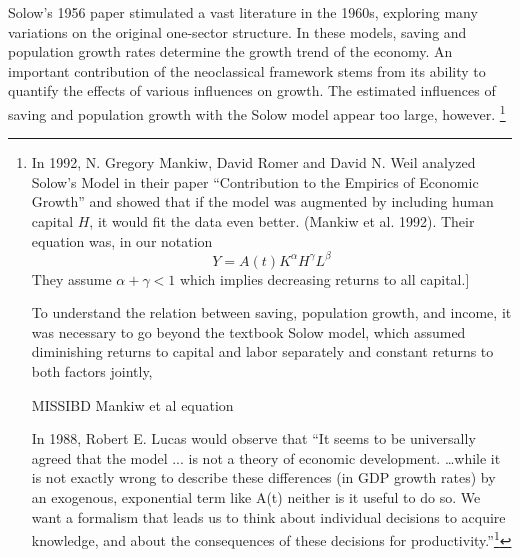 Solow's 1956 paper stimulated a vast literature in the 1960s, exploring many variations on the original one-sector structure. %
In these models, saving and population growth rates determine the growth trend of the economy. An important  contribution of the neoclassical framework stems from its ability to quantify the effects of various influences on growth. The estimated influences of saving and population growth with the Solow model appear too large, however.%
\footnote{In 1992, N. Gregory Mankiw, David Romer %
and David N. Weil analyzed Solow’s Model in their paper “Contribution to the Empirics of Economic Growth” and  showed that %
if the model was augmented by including human capital $H$, it would fit the data even better.   (Mankiw et al. 1992). Their equation was, in our notation   \[Y=A(t)K^\alpha H^\gamma L^\beta\label{Eq:Mankiw}\] They assume $\alpha+\gamma<1$ which implies decreasing returns to all capital.]

To understand the relation between saving, population growth, and income, it was necessary to go beyond the textbook Solow model, which assumed  diminishing returns to capital and labor separately and constant returns to both factors jointly,


 MISSIBD Mankiw et al equation 

In 1988, Robert E. Lucas would observe that ``It seems to be universally agreed that the model ... is not a theory of economic development.   \dots while it is not exactly wrong to describe these differences (in GDP  growth rates) by an exogenous, exponential term like A(t) neither is it useful to do so. We want a formalism that leads us to think about individual decisions to acquire knowledge, and about the consequences of these decisions for productivity.''\footnote{Lucas,  Robert E. On the Mechanics of Economic Development. Journal of Monetary Economics 22, 1988 3-42} 



}
